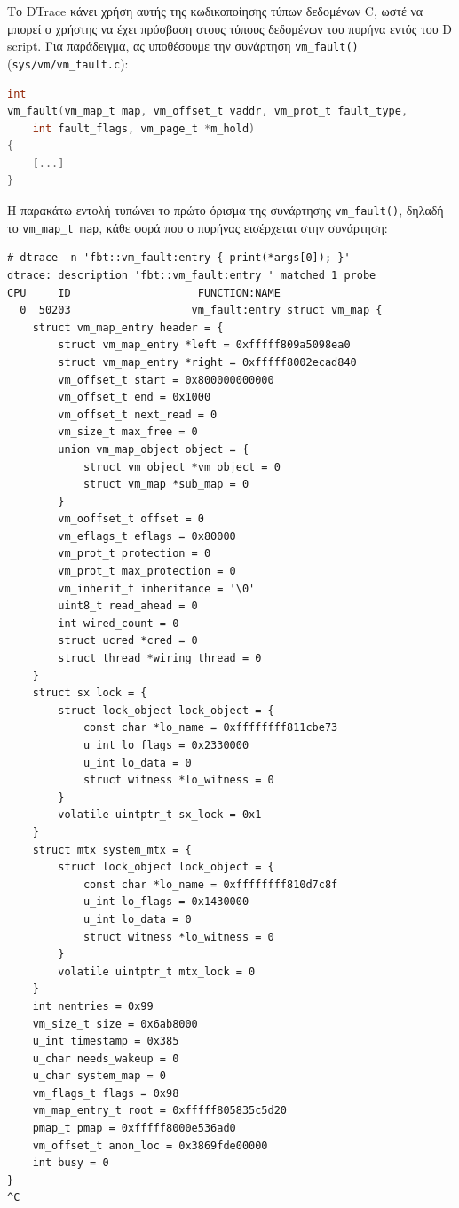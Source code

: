 \documentclass[12pt]{article}
\begin{document}
Το DTrace κάνει χρήση αυτής της κωδικοποίησης τύπων δεδομένων C, ωστέ να μπορεί
ο χρήστης να έχει πρόσβαση στους τύπους δεδομένων του πυρήνα εντός του D
script. Για παράδειγμα, ας υποθέσουμε την συνάρτηση \lstinline{vm_fault()}
(\lstinline{sys/vm/vm_fault.c}):

\begin{lstlisting}[language=C]
int
vm_fault(vm_map_t map, vm_offset_t vaddr, vm_prot_t fault_type,
    int fault_flags, vm_page_t *m_hold)
{
	[...]
}
\end{lstlisting}

Η παρακάτω εντολή τυπώνει το πρώτο όρισμα της συνάρτησης
\lstinline{vm_fault()}, δηλαδή το \lstinline{vm_map_t map}, κάθε φορά που ο
πυρήνας εισέρχεται στην συνάρτηση:

\begin{lstlisting}
# dtrace -n 'fbt::vm_fault:entry { print(*args[0]); }'
dtrace: description 'fbt::vm_fault:entry ' matched 1 probe
CPU     ID                    FUNCTION:NAME
  0  50203                   vm_fault:entry struct vm_map {
    struct vm_map_entry header = {
        struct vm_map_entry *left = 0xfffff809a5098ea0
        struct vm_map_entry *right = 0xfffff8002ecad840
        vm_offset_t start = 0x800000000000
        vm_offset_t end = 0x1000
        vm_offset_t next_read = 0
        vm_size_t max_free = 0
        union vm_map_object object = {
            struct vm_object *vm_object = 0
            struct vm_map *sub_map = 0
        }
        vm_ooffset_t offset = 0
        vm_eflags_t eflags = 0x80000
        vm_prot_t protection = 0
        vm_prot_t max_protection = 0
        vm_inherit_t inheritance = '\0'
        uint8_t read_ahead = 0
        int wired_count = 0
        struct ucred *cred = 0
        struct thread *wiring_thread = 0
    }
    struct sx lock = {
        struct lock_object lock_object = {
            const char *lo_name = 0xffffffff811cbe73
            u_int lo_flags = 0x2330000
            u_int lo_data = 0
            struct witness *lo_witness = 0
        }
        volatile uintptr_t sx_lock = 0x1
    }
    struct mtx system_mtx = {
        struct lock_object lock_object = {
            const char *lo_name = 0xffffffff810d7c8f
            u_int lo_flags = 0x1430000
            u_int lo_data = 0
            struct witness *lo_witness = 0
        }
        volatile uintptr_t mtx_lock = 0
    }
    int nentries = 0x99
    vm_size_t size = 0x6ab8000
    u_int timestamp = 0x385
    u_char needs_wakeup = 0
    u_char system_map = 0
    vm_flags_t flags = 0x98
    vm_map_entry_t root = 0xfffff805835c5d20
    pmap_t pmap = 0xfffff8000e536ad0
    vm_offset_t anon_loc = 0x3869fde00000
    int busy = 0
}
^C
\end{lstlisting}
\end{document}
